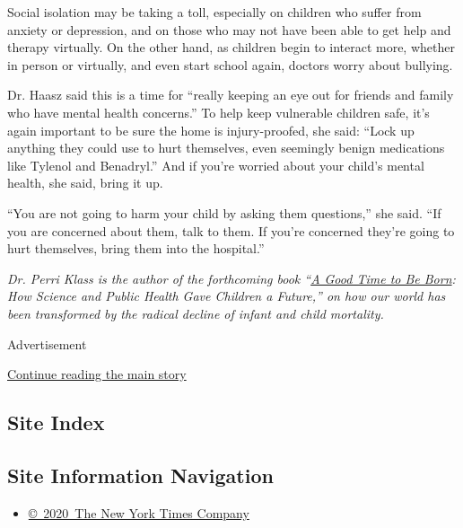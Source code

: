 Social isolation may be taking a toll, especially on children who suffer
from anxiety or depression, and on those who may not have been able to
get help and therapy virtually. On the other hand, as children begin to
interact more, whether in person or virtually, and even start school
again, doctors worry about bullying.

Dr. Haasz said this is a time for ``really keeping an eye out for
friends and family who have mental health concerns.'' To help keep
vulnerable children safe, it's again important to be sure the home is
injury-proofed, she said: ``Lock up anything they could use to hurt
themselves, even seemingly benign medications like Tylenol and
Benadryl.'' And if you're worried about your child's mental health, she
said, bring it up.

``You are not going to harm your child by asking them questions,'' she
said. ``If you are concerned about them, talk to them. If you're
concerned they're going to hurt themselves, bring them into the
hospital.''

\emph{Dr. Perri Klass is the author of the forthcoming book
``}\href{https://www.amazon.com/Good-Time-Be-Born-Children/dp/0393609995/ref=tmm_hrd_swatch_0?_encoding=UTF8\&qid=\&sr=}{\emph{A
Good Time to Be Born}}\emph{: How Science and Public Health Gave
Children a Future,'' on how our world has been transformed by the
radical decline of infant and child mortality.}

Advertisement

\protect\hyperlink{after-bottom}{Continue reading the main story}

\hypertarget{site-index}{%
\subsection{Site Index}\label{site-index}}

\hypertarget{site-information-navigation}{%
\subsection{Site Information
Navigation}\label{site-information-navigation}}

\begin{itemize}
\tightlist
\item
  \href{https://help.nytimes.com/hc/en-us/articles/115014792127-Copyright-notice}{©~2020~The
  New York Times Company}
\end{itemize}

